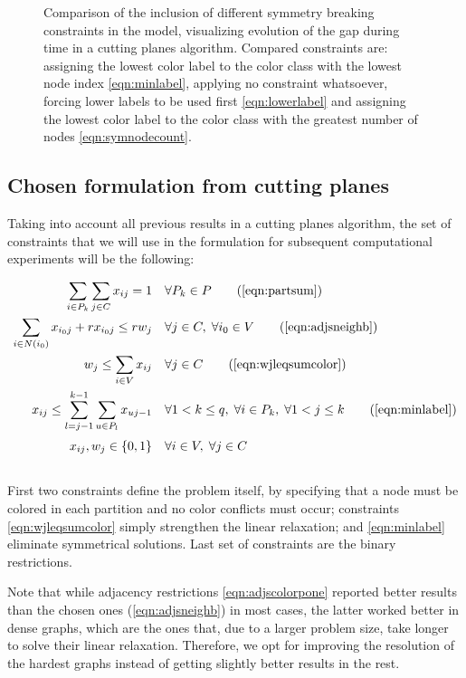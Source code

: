 \begin{figure}
\caption{Comparison of the inclusion of different symmetry breaking constraints in the model, visualizing evolution of the gap during time in a cutting planes algorithm. Compared constraints are: assigning the lowest color label to the color class with the lowest node index \eqref{eqn:minlabel}, applying no constraint whatsoever, forcing lower labels to be used first \eqref{eqn:lowerlabel} and assigning the lowest color label to the color class with the greatest number of nodes \eqref{eqn:symnodecount}.}
\label{fig:models:sym}
\end{figure}


\subsection{Chosen formulation from cutting planes}
\label{subsubsec:results:model:chosen}

Taking into account all previous results in a cutting planes algorithm, the set of constraints that we will use in the \PCP{} formulation for subsequent computational experiments will be the following:

\begin{align}
\sum_{i \in P_k} \sum_{j \in C} x_{ij} = 1 \quad &\forall P_k \in P \tag{\ref{eqn:partsum}} \\
 \sum_{i \in N(i_0)} x_{i_0j} + r x_{i_0j} \leq r w_j \quad &\forall j \in C, \; \forall i_0 \in V \tag{\ref{eqn:adjsneighb}} \\
 w_j \leq \sum_{i \in V} x_{ij} \quad &\forall j \in C \tag{\ref{eqn:wjleqsumcolor}} \\
 x_{ij} \leq \sum_{l = j-1}^{k-1} \sum_{u \in P_l} x_{uj-1} \quad &\forall 1 < k \leq q, \; \forall i \in P_k, \; \forall 1 < j \leq k \tag{\ref{eqn:minlabel}} \\
  x_{ij}, w_{j} \in \{0,1\} \quad &\forall i \in V, \; \forall j \in C \sumheight \nonumber
\end{align}

First two constraints define the problem itself, by specifying that a node must be colored in each partition and no color conflicts must occur; constraints \ref{eqn:wjleqsumcolor} simply strengthen the linear relaxation; and \ref{eqn:minlabel} eliminate symmetrical solutions. Last set of constraints are the binary restrictions.

Note that while adjacency restrictions \ref{eqn:adjscolorpone} reported better results than the chosen ones (\ref{eqn:adjsneighb}) in most cases, the latter worked better in dense graphs, which are the ones that, due to a larger problem size, take longer to solve their linear relaxation. Therefore, we opt for improving the resolution of the hardest graphs instead of getting slightly better results in the rest. 


